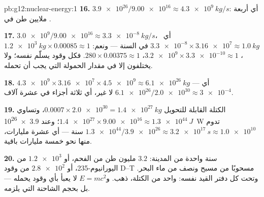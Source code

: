 \begin{solution}{pb:g12:nuclear-energy:1}
\textbf{16.} $\num{3.9e26}/\num{9.00e16} \approx \qty{4.3e9}{kg/s}$:
أي أربعة ملايين طن في .

\textbf{17.} $\num{3.0e9}/\num{9.00e16} \approx \qty{3.3e-8}{kg/s}$،
أي\ $\num{3.3e-8} \times \num{3.16e7} \approx \qty{1.0}{kg}$ في السنة
--- ونعم: $\qty{1.2e3}{kg} \times 0.00085 \approx 1$، $\num{3.2e9}
\times \num{3.3e-10} \approx 1$، $280 \times 0.00375 \approx 1$. فكل
وقود يسلّم  نفسه؛ ولا يختلفون إلا في مقدار الحمولة
التي يجب أن تحمله.

\textbf{18.} $\num{4.3e9} \times \num{3.16e7} \times \num{4.5e9}
\approx \qty{6.1e26}{kg}$ --- أي $\num{6.1e26}/\num{2.0e30} \approx
\num{3e-4}$ لا غير، أي ثلاثة أجزاء في عشرة آلاف.

\textbf{19.} الكتلة القابلة للتحويل $0.0007 \times \num{2.0e30} =
\qty{1.4e27}{kg}$، وتساوي $\num{1.4e27} \times \num{9.00e16} \approx
\qty{1.3e44}{J}$؛ وعند \qty{3.9e26}{W} تدوم $\num{1.3e44}/
\num{3.9e26} \approx \qty{3.2e17}{s} \approx \num{1.0e10}$ سنة ---
أي عشرة مليارات، منها نحو خمسة مليارات باقية.

\textbf{20.} سنة واحدة من المدينة: $3.2$ مليون طن من الفحم، أو
$\num{1.2e3}$  من اليورانيوم-235، أو $\num{2.8e2}$  من
وقود D--T مسحوبًا من مسبح ونصف من ماء البحر. وتحت كل دفتر
القيد نفسه:  واحد من الكتلة، ذهب. و$E = mc^2$ لا يعبأ بأي
وقود يحمله --- بل بحجم الشاحنة التي يلزمه.
\end{solution}
